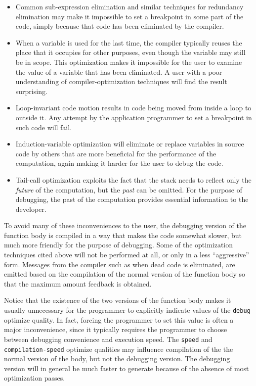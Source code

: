 \begin{itemize}
\item Common sub-expression elimination and similar techniques for
  redundancy elimination may make it impossible to set
  a breakpoint in some part of the code, simply because that code has
  been eliminated by the compiler.
\item When a variable is used for the last time, the compiler
  typically reuses the place that it occupies for other purposes, even
  though the variable may still be in scope.  This optimization makes
  it impossible for the user to examine the value of
  a variable that has been eliminated.  A user with
  a poor understanding of compiler-optimization techniques will find
  the result surprising.
\item Loop-invariant code motion results in code being moved from
  inside a loop to outside it.  Any attempt by the application
  programmer to set a breakpoint in such code will fail.
\item Induction-variable optimization will eliminate or replace
  variables in source code by others that are more beneficial for
  the performance of the computation, again making it harder for the
  user to debug the code.
\item Tail-call optimization exploits the fact that the stack needs to
  reflect only the \emph{future} of the computation, but the
  \emph{past} can be omitted.  For the purpose of debugging, the past
  of the computation provides essential information to the developer.
\end{itemize}

\noindent
To avoid many of these inconveniences to the user,
the debugging version of the function body is compiled in a way that
makes the code somewhat slower, but much more friendly for the purpose
of debugging.  Some of the optimization techniques cited above will
not be performed at all, or only in a less ``aggressive'' form.
Messages from the compiler such as when dead code is eliminated, are
emitted based on the compilation of the normal version of the function
body so that the maximum amount feedback is obtained.

Notice that the existence of the two versions of the function body
makes it usually unnecessary for the programmer to explicitly indicate
values of the \texttt{debug} optimize quality.  In fact, forcing the
programmer to set this value is often a major inconvenience, since it
typically requires the programmer to choose between debugging
convenience and execution speed.  The \texttt{speed} and
\texttt{compilation-speed} optimize qualities may influence
compilation of the the normal version of the body, but not the
debugging version.  The debugging version will in general be much
faster to generate because of the absence of most optimization passes.

